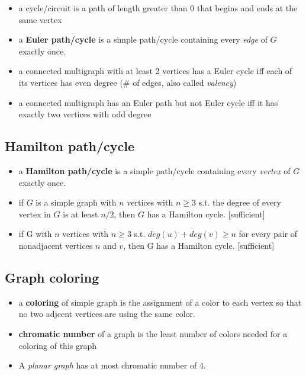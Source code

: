 \documentclass[11pt, oneside]{article}   	%
\begin{document}
\begin{itemize}
\item a cycle/circuit is a path of length greater than 0 that begins and ends at the same vertex
\item a \textbf{Euler path/cycle} is a simple path/cycle containing every \textit{edge} of $G$ exactly once.
\item a connected multigraph with at least 2 vertices has a Euler cycle iff each of its vertices has even degree (\# of edges, also called \textit{valency})
\item a connected multigraph has an Euler path but not Euler cycle iff it has exactly two vertices with odd degree
\end{itemize}

\subsection{Hamilton path/cycle}

\begin{itemize}
\item a \textbf{Hamilton path/cycle} is a simple path/cycle containing every \textit{vertex} of $G$ exactly once.
\item if $G$ is a simple graph with $n$ vertices with $n\geq 3$ s.t. the degree of every vertex in $G$ is at least $n/2$, then $G$ has a Hamilton cycle. [sufficient]
\item if G with $n$ vertices with $n\geq 3$ s.t. $deg(u)+deg(v)\geq n$ for every pair of nonadjacent vertices $n$ and $v$, then G has a Hamilton cycle. [sufficient]
\end{itemize}

\subsection{Graph coloring}

\begin{itemize}
\item a \textbf{coloring} of simple graph is the assignment of a color to each vertex so that no two adjcent vertices are using the same color.
\item \textbf{chromatic number} of a graph is the least number of colors needed for a coloring of this graph
\item A \textit{planar graph} has at most chromatic number of 4.
\end{itemize}
\end{document}
